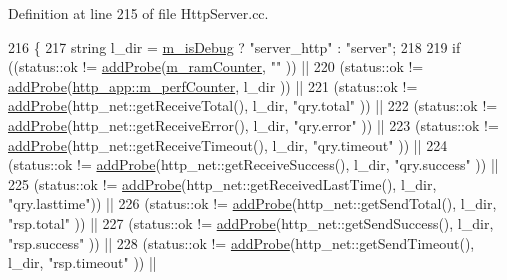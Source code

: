 Definition at line 215 of file Http\-Server.\-cc.


\begin{DoxyCode}
216 \{
217   \textcolor{keywordtype}{string} l\_dir = \hyperlink{classxtd_1_1servers_1_1app_1_1HttpServer_ae8b1e546b8f464e0a18c6b737ed82df8}{m\_isDebug} ? \textcolor{stringliteral}{"server\_http"} : \textcolor{stringliteral}{"server"};
218 
219   \textcolor{keywordflow}{if} ((status::ok != \hyperlink{classxtd_1_1servers_1_1app_1_1HttpServer_a0ff20a40a0e31dbb1e82be87be0e255f}{addProbe}(\hyperlink{classxtd_1_1servers_1_1app_1_1HttpServer_a0758f122d486bc068d796d4ce550e99f}{m\_ramCounter},                    \textcolor{stringliteral}{""}                      
          )) ||
220       (status::ok != \hyperlink{classxtd_1_1servers_1_1app_1_1HttpServer_a0ff20a40a0e31dbb1e82be87be0e255f}{addProbe}(\hyperlink{classxtd_1_1servers_1_1app_1_1HttpServer_afc57d4c9bc2f9a47440e3c54eb92b1fb}{http\_app::m\_perfCounter},         l\_dir        
                     )) ||
221       (status::ok != \hyperlink{classxtd_1_1servers_1_1app_1_1HttpServer_a0ff20a40a0e31dbb1e82be87be0e255f}{addProbe}(http\_net::getReceiveTotal(),     l\_dir,        \textcolor{stringliteral}{"qry.total"}   )) ||
222       (status::ok != \hyperlink{classxtd_1_1servers_1_1app_1_1HttpServer_a0ff20a40a0e31dbb1e82be87be0e255f}{addProbe}(http\_net::getReceiveError(),     l\_dir,        \textcolor{stringliteral}{"qry.error"}   )) ||
223       (status::ok != \hyperlink{classxtd_1_1servers_1_1app_1_1HttpServer_a0ff20a40a0e31dbb1e82be87be0e255f}{addProbe}(http\_net::getReceiveTimeout(),   l\_dir,        \textcolor{stringliteral}{"qry.timeout"} )) ||
224       (status::ok != \hyperlink{classxtd_1_1servers_1_1app_1_1HttpServer_a0ff20a40a0e31dbb1e82be87be0e255f}{addProbe}(http\_net::getReceiveSuccess(),   l\_dir,        \textcolor{stringliteral}{"qry.success"} )) ||
225       (status::ok != \hyperlink{classxtd_1_1servers_1_1app_1_1HttpServer_a0ff20a40a0e31dbb1e82be87be0e255f}{addProbe}(http\_net::getReceivedLastTime(), l\_dir,        \textcolor{stringliteral}{"qry.lasttime"})) ||
226       (status::ok != \hyperlink{classxtd_1_1servers_1_1app_1_1HttpServer_a0ff20a40a0e31dbb1e82be87be0e255f}{addProbe}(http\_net::getSendTotal(),        l\_dir,        \textcolor{stringliteral}{"rsp.total"}   )) ||
227       (status::ok != \hyperlink{classxtd_1_1servers_1_1app_1_1HttpServer_a0ff20a40a0e31dbb1e82be87be0e255f}{addProbe}(http\_net::getSendSuccess(),      l\_dir,        \textcolor{stringliteral}{"rsp.success"} )) ||
228       (status::ok != \hyperlink{classxtd_1_1servers_1_1app_1_1HttpServer_a0ff20a40a0e31dbb1e82be87be0e255f}{addProbe}(http\_net::getSendTimeout(),      l\_dir,        \textcolor{stringliteral}{"rsp.timeout"} )) ||

\end{DoxyCode}

